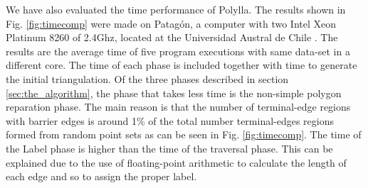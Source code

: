 \documentclass[lineno,pdflatex,sn-mathphys]{sn-jnl}%
\theoremstyle{thmstyleone}%
\theoremstyle{thmstyletwo}%
\theoremstyle{thmstylethree}%
\begin{document}
 We have also evaluated the time performance of Polylla. The results  shown in Fig. \ref{fig:timecomp} were made on  Patagón, a computer with two Intel Xeon Platinum 8260 of 2.4Ghz, located at the  Universidad Austral de Chile \cite{patagon-uach}. The results are the average time of  five program executions with same data-set in a different core.  
 The time of each phase  is included together with time to generate the initial triangulation. 
 Of the three phases described in section \ref{sec:the_algorithm}, the  phase that takes less time is the non-simple polygon reparation phase. The main reason is that the number of terminal-edge regions with barrier edges  is around 1\% of the total  number  terminal-edges regions formed from random point sets  as  can be seen in Fig. \ref{fig:timecomp}.
 The time  of the Label phase is higher than the time of the traversal phase. This can be explained due to the use of floating-point arithmetic  to calculate the length of each edge  and so to assign the proper label. 



\end{document}
